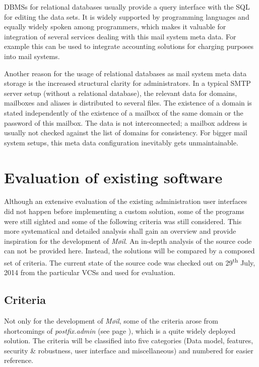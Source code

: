 \documentclass[12pt,a4paper]{scrartcl}
\begin{document}

		\acp{DBMS} for relational databases usually provide a query interface
		with the \ac{SQL} \cite{sql} for editing the data sets. It is widely
		supported by programming languages and equally widely spoken among
		programmers, which makes it valuable for integration of several
		services dealing with this mail system meta data. For example this can
		be used to integrate accounting solutions for charging purposes into
		mail systems.


		Another reason for the usage of relational databases as mail system
		meta data storage is the increased structural clarity for
		administrators. In a typical \acs{SMTP} \cite{smtp} server setup
		(without a relational database), the relevant data for domains,
		mailboxes and aliases is distributed to several files. The existence of
		a domain is stated independently of the existence of a mailbox of the
		same domain or the password of this mailbox. The data is not
		interconnected; a mailbox address is usually not checked against the
		list of domains for consistency. For bigger mail system setups, this
		meta data configuration inevitably gets unmaintainable.

	\section{Evaluation of existing software}

		Although an extensive evaluation of the existing administration user
		interfaces did not happen before implementing a custom solution, some
		of the programs were still sighted and some of the following criteria
		was still considered. This more systematical and detailed analysis
		shall gain an overview and provide inspiration for the development of
		\emph{Møil}. An in-depth analysis of the source code can not be
		provided here. Instead, the solutions will be compared by a composed
		set of criteria. The current state of the source code was checked out
		on 29\textsuperscript{th} July, 2014 from the particular \acp{VCS} and
		used for evaluation.

		\subsection{Criteria}
		\label{sec:evaluation:criteria}
			Not only for the development of \emph{Møil}, some of the criteria
			arose from shortcomings of \emph{postfix.admin} (see page
			\pageref{sec:contestants:postfix.admin}), which is a quite widely
			deployed solution. The criteria will be classified into five
			categories (Data model, features, security \& robustness, user
			interface and miscellaneous) and numbered for easier reference.
\end{document}
